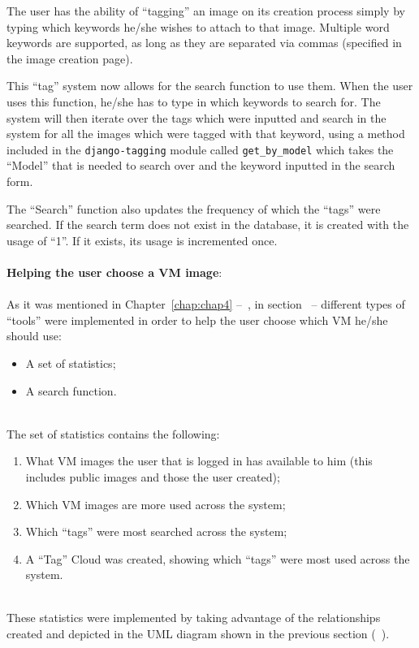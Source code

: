 The user has the ability of ``tagging'' an image on its creation process simply by typing which keywords he/she wishes to attach to that image. Multiple word keywords are supported, as long as they are separated via commas (specified in the image creation page).

This ``tag'' system now allows for the search function to use them. When the user uses this function, he/she has to type in which keywords to search for. The system will then iterate over the tags which were inputted and search in the system for all the images which were tagged with that keyword, using a method included in the \texttt{django-tagging} module called \texttt{get_by_model} which takes the ``Model'' that is needed to search over and the keyword inputted in the search form.

The ``Search'' function also updates the frequency of which the ``tags'' were searched. If the search term does not exist in the database, it is created with the usage of ``1''. If it exists, its usage is incremented once.\\
\ \\
\textbf{Helping the user choose a VM image}:\\
\ \\
As it was mentioned in Chapter~\ref{chap:chap4} --~, in section~ -- different types of ``tools'' were implemented in order to help the user choose which VM he/she should use:

\begin{itemize}
\item A set of statistics;
\item A search function.
\end{itemize}

\ \\
The set of statistics contains the following:

\begin{enumerate}
\item What VM images the user that is logged in has available to him (this includes public images and those the user created);
\item Which VM images are more used across the system;
\item Which ``tags'' were most searched across the system;
\item A ``Tag'' Cloud was created, showing which ``tags'' were most used across the system.
\end{enumerate}
\ \\
These statistics were implemented by taking advantage of the relationships created and depicted in the UML diagram shown in the previous section (~). 

